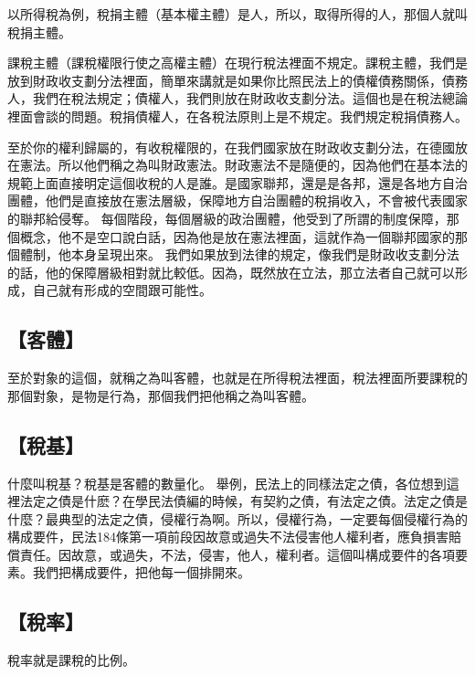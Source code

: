 \documentclass[oneside,sub3section]{ctexbook}
\begin{document}
以所得稅為例，稅捐主體（基本權主體）是人，所以，取得所得的人，那個人就叫稅捐主體。

課稅主體（課稅權限行使之高權主體）在現行稅法裡面不規定。課稅主體，我們是放到財政收支劃分法裡面，簡單來講就是如果你比照民法上的債權債務關係，債務人，我們在稅法規定；債權人，我們則放在財政收支劃分法。這個也是在稅法總論裡面會談的問題。稅捐債權人，在各稅法原則上是不規定。我們規定稅捐債務人。

至於你的權利歸屬的，有收稅權限的，在我們國家放在財政收支劃分法，在德國放在憲法。所以他們稱之為叫財政憲法。財政憲法不是隨便的，因為他們在基本法的規範上面直接明定這個收稅的人是誰。是國家聯邦，還是是各邦，還是各地方自治團體，他們是直接放在憲法層級，保障地方自治團體的稅捐收入，不會被代表國家的聯邦給侵奪。
每個階段，每個層級的政治團體，他受到了所謂的制度保障，那個概念，他不是空口說白話，因為他是放在憲法裡面，這就作為一個聯邦國家的那個體制，他本身呈現出來。
我們如果放到法律的規定，像我們是財政收支劃分法的話，他的保障層級相對就比較低。因為，既然放在立法，那立法者自己就可以形成，自己就有形成的空間跟可能性。

\hypertarget{ux5ba2ux9ad4}{%
\subsection{【客體】}\label{ux5ba2ux9ad4}}

至於對象的這個，就稱之為叫客體，也就是在所得稅法裡面，稅法裡面所要課稅的那個對象，是物是行為，那個我們把他稱之為叫客體。

\hypertarget{ux7a05ux57fa}{%
\subsection{【稅基】}\label{ux7a05ux57fa}}

什麼叫稅基？稅基是客體的數量化。
舉例，民法上的同樣法定之債，各位想到這裡法定之債是什麽？在學民法債編的時候，有契約之債，有法定之債。法定之債是什麼？最典型的法定之債，侵權行為啊。所以，侵權行為，一定要每個侵權行為的構成要件，民法184條第一項前段因故意或過失不法侵害他人權利者，應負損害賠償責任。因故意，或過失，不法，侵害，他人，權利者。這個叫構成要件的各項要素。我們把構成要件，把他每一個排開來。

\hypertarget{ux7a05ux7387}{%
\subsection{【稅率】}\label{ux7a05ux7387}}

稅率就是課稅的比例。
\end{document}

